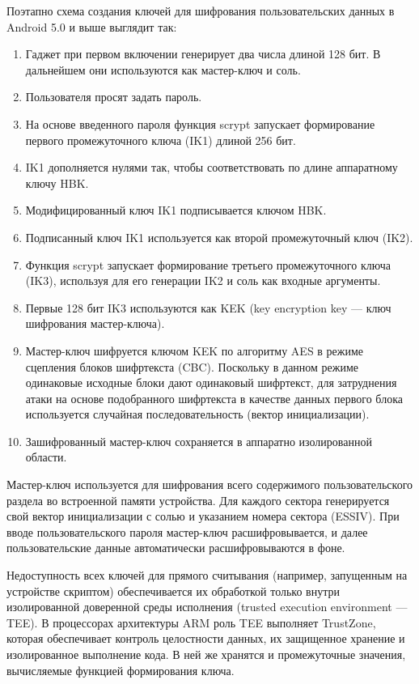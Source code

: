 Поэтапно схема создания ключей для шифрования пользовательских данных в Android 5.0 и выше выглядит так:

\begin{enumerate}
    \item Гаджет при первом включении генерирует два числа длиной 128 бит. В
    дальнейшем они используются как мастер-ключ и соль.
    \item Пользователя просят задать пароль.
    \item На основе введенного пароля функция scrypt запускает формирование
    первого промежуточного ключа (IK1) длиной 256 бит.
    \item IK1 дополняется нулями так, чтобы соответствовать по длине
    аппаратному ключу HBK.
    \item Модифицированный ключ IK1 подписывается ключом HBK.
    \item Подписанный ключ IK1 используется как второй промежуточный ключ (IK2).
    \item Функция scrypt запускает формирование третьего промежуточного ключа
    (IK3), используя для его генерации IK2 и соль как входные аргументы.
    \item Первые 128 бит IK3 используются как KEK (key encryption key — ключ
    шифрования мастер-ключа).
    \item Мастер-ключ шифруется ключом KEK по алгоритму AES в режиме сцепления
    блоков шифртекста (CBC). Поскольку в данном режиме одинаковые исходные
    блоки дают одинаковый шифртекст, для затруднения атаки на основе
    подобранного шифртекста в качестве данных первого блока используется
    случайная последовательность (вектор инициализации).
    \item Зашифрованный мастер-ключ сохраняется в аппаратно изолированной области.
\end{enumerate}

Мастер-ключ используется для шифрования всего содержимого пользовательского
раздела во встроенной памяти устройства. Для каждого сектора генерируется свой
вектор инициализации с солью и указанием номера сектора (ESSIV). При вводе
пользовательского пароля мастер-ключ расшифровывается, и далее пользовательские
данные автоматически расшифровываются в фоне.

Недоступность всех ключей для прямого считывания (например, запущенным на
устройстве скриптом) обеспечивается их обработкой только внутри изолированной
доверенной среды исполнения (trusted execution environment — TEE). В
процессорах архитектуры ARM роль TEE выполняет TrustZone, которая обеспечивает
контроль целостности данных, их защищенное хранение и изолированное выполнение
кода. В ней же хранятся и промежуточные значения, вычисляемые функцией
формирования ключа.


